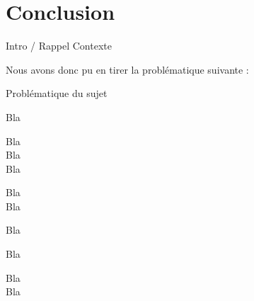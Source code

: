 \chapter{Conclusion}

Intro / Rappel Contexte

Nous avons donc pu en tirer la problématique suivante :

\begin{center}
\hskip7mm
Problématique du sujet
\end{center}

Bla

Bla\\

Bla\\

Bla

Bla\\

Bla

Bla

\newpage

Bla

Bla\\

Bla